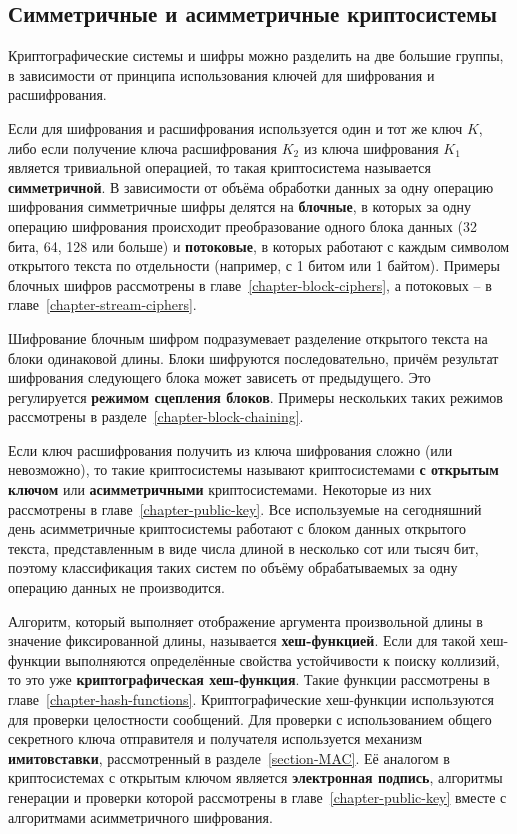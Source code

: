\subsection{Симметричные и асимметричные криптосистемы}

Криптографические системы и шифры можно разделить на две большие группы, в зависимости от принципа использования ключей для шифрования и расшифрования.

Если для шифрования и расшифрования используется один и тот же ключ $K$, либо если получение ключа расшифрования $K_2$ из ключа шифрования $K_1$ является тривиальной операцией, то такая криптосистема называется \textbf{симметричной}. В зависимости от объёма обработки данных за одну операцию шифрования симметричные шифры делятся на \textbf{блочные}, в которых за одну операцию шифрования происходит преобразование одного блока данных (32 бита, 64, 128 или больше) и \textbf{потоковые}, в которых работают с каждым символом открытого текста по отдельности (например, с 1 битом или 1 байтом). Примеры блочных шифров рассмотрены в главе~\ref{chapter-block-ciphers}, а потоковых -- в главе~\ref{chapter-stream-ciphers}.

Шифрование блочным шифром подразумевает разделение открытого текста на блоки одинаковой длины. Блоки шифруются последовательно, причём результат шифрования следующего блока может зависеть от предыдущего. Это регулируется \textbf{режимом сцепления блоков}. Примеры нескольких таких режимов рассмотрены в разделе~\ref{chapter-block-chaining}.

Если ключ расшифрования получить из ключа шифрования сложно (или невозможно), то такие криптосистемы называют криптосистемами \textbf{с открытым ключом} или \textbf{асимметричными} криптосистемами. Некоторые из них рассмотрены в главе~\ref{chapter-public-key}. Все используемые на сегодняшний день асимметричные криптосистемы работают с блоком данных открытого текста, представленным в виде числа длиной в несколько сот или тысяч бит, поэтому классификация таких систем по объёму обрабатываемых за одну операцию данных не производится.

Алгоритм, который выполняет отображение аргумента произвольной длины в значение фиксированной длины, называется \textbf{хеш-функцией}. Если для такой хеш-функции выполняются определённые свойства устойчивости к поиску коллизий, то это уже \textbf{криптографическая хеш-функция}. Такие функции рассмотрены в главе~\ref{chapter-hash-functions}. Криптографические хеш-функции используются для проверки целостности сообщений. Для проверки с использованием общего секретного ключа отправителя и получателя используется механизм \textbf{имитовставки}, рассмотренный в разделе~\ref{section-MAC}. Её аналогом в криптосистемах с открытым ключом является \textbf{электронная подпись}, алгоритмы генерации и проверки которой рассмотрены в главе~\ref{chapter-public-key} вместе с алгоритмами асимметричного шифрования.
